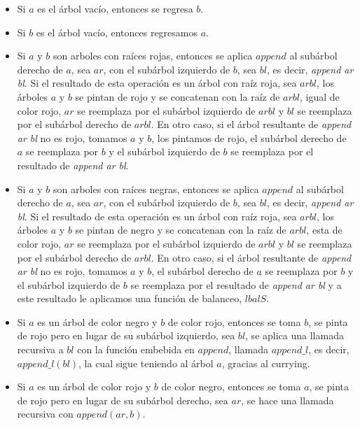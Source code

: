 \begin{itemize}
    \item Si $a$ es el \'arbol vacío, entonces se regresa $b$.
    \item Si $b$ es el \'arbol vacío, entonces regresamos $a$.
    \item Si $a$ y $b$ son arboles con raíces rojas, entonces se aplica $append$ al subárbol
    derecho de $a$, sea $ar$, con el subárbol izquierdo de $b$, sea $bl$, es decir, \textit{append
    ar bl}. Si el resultado de esta operación es un árbol con raíz roja, sea $arbl$, los \'arboles
    $a$ y $b$ se pintan de rojo y se concatenan con la raíz de $arbl$, igual de color rojo, $ar$ se
    reemplaza por el subárbol izquierdo de $arbl$ y $bl$ se reemplaza por el subárbol derecho de
    $arbl$.
    En otro caso, si el \'arbol resultante de \textit{append ar bl} no es rojo, tomamos $a$ y $b$,
    los pintamos de rojo, el subárbol derecho de $a$ se reemplaza por $b$ y el subárbol izquierdo
    de $b$ se reemplaza por el resultado de \textit{append ar bl}.
    \item Si $a$ y $b$ son arboles con raíces negras, entonces se aplica $append$ al subárbol
    derecho de $a$, sea $ar$, con el subárbol izquierdo de $b$, sea $bl$, es decir, \textit{append
    ar bl}. Si el resultado de esta operación es un árbol con raíz roja, sea $arbl$, los \'arboles
    $a$ y $b$ se pintan de negro y se concatenan con la raíz de $arbl$, esta de color rojo, $ar$ se
    reemplaza por el subárbol izquierdo de $arbl$ y $bl$ se reemplaza por el subárbol derecho de
    $arbl$.
    En otro caso, si el \'arbol resultante de \textit{append ar bl} no es rojo, tomamos $a$ y $b$,
    el subárbol derecho de $a$ se reemplaza por $b$ y el subárbol izquierdo de $b$ se reemplaza por
    el resultado de \textit{append ar bl} y a este resultado le aplicamos una función de balanceo,
    $lbalS$.
    \item Si $a$ es un \'arbol de color negro y $b$ de color rojo, entonces se toma $b$, se pinta
    de rojo pero en lugar de su subárbol izquierdo, sea $bl$, se aplica una llamada recursiva a
    $bl$ con la funci\'on embebida en $append$, llamada $append\_l$, es decir, $append\_l(bl)$, la
    cual sigue teniendo al \'arbol $a$, gracias al currying\cite{Currying}.
    \item Si $a$ es un \'arbol de color rojo y $b$ de color negro, entonces se toma $a$, se pinta
    de rojo pero en lugar de su subárbol derecho, sea $ar$, se hace una llamada recursiva con
    $append(ar,b)$.
\end{itemize}

